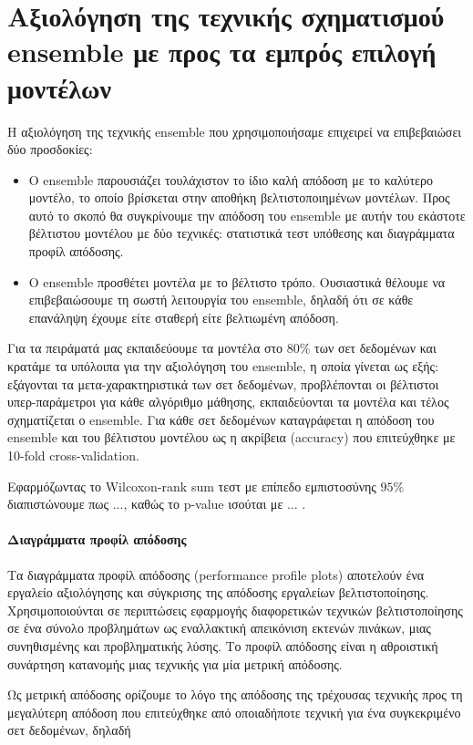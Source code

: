 \section{Αξιολόγηση της τεχνικής σχηματισμού ensemble με προς τα εμπρός επιλογή μοντέλων} \label{section:tensemble}
H αξιολόγηση της τεχνικής ensemble που χρησιμοποιήσαμε επιχειρεί να επιβεβαιώσει δύο προσδοκίες:
\begin{itemize}
	\item Ο ensemble παρουσιάζει τουλάχιστον το ίδιο καλή απόδοση με το καλύτερο μοντέλο, το οποίο βρίσκεται στην αποθήκη βελτιστοποιημένων μοντέλων. Προς αυτό το σκοπό θα συγκρίνουμε την απόδοση του ensemble με αυτήν του εκάστοτε βέλτιστου μοντέλου με δύο τεχνικές: στατιστικά τεστ υπόθεσης και διαγράμματα προφίλ απόδοσης.
	\item Ο ensemble προσθέτει μοντέλα με το βέλτιστο τρόπο. Ουσιαστικά θέλουμε να επιβεβαιώσουμε τη σωστή λειτουργία του ensemble, δηλαδή ότι σε κάθε επανάληψη έχουμε είτε σταθερή είτε βελτιωμένη απόδοση.
\end{itemize}

Για τα πειράματά μας εκπαιδεύουμε τα μοντέλα στο $80\%$ των σετ δεδομένων και κρατάμε τα υπόλοιπα για την αξιολόγηση του ensemble, η οποία γίνεται ως εξής: εξάγονται τα μετα-χαρακτηριστικά των σετ δεδομένων, προβλέπονται οι βέλτιστοι υπερ-παράμετροι για κάθε αλγόριθμο μάθησης, εκπαιδεύονται τα μοντέλα και τέλος σχηματίζεται ο ensemble. Για κάθε σετ δεδομένων καταγράφεται η απόδοση του ensemble και του βέλτιστου μοντέλου ως η ακρίβεια (accuracy) που επιτεύχθηκε με 10-fold cross-validation. 

Εφαρμόζωντας το Wilcoxon-rank sum τεστ με επίπεδο εμπιστοσύνης $95\%$ διαπιστώνουμε πως ..., καθώς το p-value ισούται με ... .

\paragraph{Διαγράμματα προφίλ απόδοσης} 	Τα διαγράμματα προφίλ απόδοσης (performance profile plots) \citep{Dolan2002} αποτελούν ένα εργαλείο αξιολόγησης και σύγκρισης της απόδοσης εργαλείων βελτιστοποίησης. Χρησιμοποιούνται σε περιπτώσεις εφαρμογής διαφορετικών τεχνικών βελτιστοποίησης σε ένα σύνολο προβλημάτων ως εναλλακτική απεικόνιση εκτενών πινάκων, μιας συνηθισμένης και προβληματικής λύσης. Το προφίλ απόδοσης είναι η αθροιστική συνάρτηση κατανομής μιας τεχνικής για μία μετρική απόδοσης.

Ως μετρική απόδοσης ορίζουμε το λόγο της απόδοσης της τρέχουσας τεχνικής προς τη μεγαλύτερη απόδοση που επιτεύχθηκε από οποιαδήποτε τεχνική για ένα συγκεκριμένο σετ δεδομένων, δηλαδή


